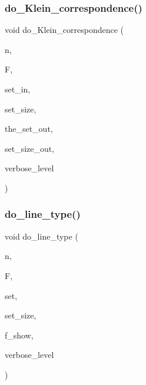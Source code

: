 \subsubsection{\texorpdfstring{do\+\_\+\+Klein\+\_\+correspondence()}{do\_Klein\_correspondence()}}
{\footnotesize\ttfamily void do\+\_\+\+Klein\+\_\+correspondence (\begin{DoxyParamCaption}\item[{\mbox{\hyperlink{galois_8h_a09fddde158a3a20bd2dcadb609de11dc}{I\+NT}}}]{n,  }\item[{\mbox{\hyperlink{classfinite__field}{finite\+\_\+field}} $\ast$}]{F,  }\item[{\mbox{\hyperlink{galois_8h_a09fddde158a3a20bd2dcadb609de11dc}{I\+NT}} $\ast$}]{set\+\_\+in,  }\item[{\mbox{\hyperlink{galois_8h_a09fddde158a3a20bd2dcadb609de11dc}{I\+NT}}}]{set\+\_\+size,  }\item[{\mbox{\hyperlink{galois_8h_a09fddde158a3a20bd2dcadb609de11dc}{I\+NT}} $\ast$\&}]{the\+\_\+set\+\_\+out,  }\item[{\mbox{\hyperlink{galois_8h_a09fddde158a3a20bd2dcadb609de11dc}{I\+NT}} \&}]{set\+\_\+size\+\_\+out,  }\item[{\mbox{\hyperlink{galois_8h_a09fddde158a3a20bd2dcadb609de11dc}{I\+NT}}}]{verbose\+\_\+level }\end{DoxyParamCaption})}

\mbox{\label{geometric__operations_8_c_a56d3becea533e33d94f5f83cf2f77d56}} 
\subsubsection{\texorpdfstring{do\+\_\+line\+\_\+type()}{do\_line\_type()}}
{\footnotesize\ttfamily void do\+\_\+line\+\_\+type (\begin{DoxyParamCaption}\item[{\mbox{\hyperlink{galois_8h_a09fddde158a3a20bd2dcadb609de11dc}{I\+NT}}}]{n,  }\item[{\mbox{\hyperlink{classfinite__field}{finite\+\_\+field}} $\ast$}]{F,  }\item[{\mbox{\hyperlink{galois_8h_a09fddde158a3a20bd2dcadb609de11dc}{I\+NT}} $\ast$}]{set,  }\item[{\mbox{\hyperlink{galois_8h_a09fddde158a3a20bd2dcadb609de11dc}{I\+NT}}}]{set\+\_\+size,  }\item[{\mbox{\hyperlink{galois_8h_a09fddde158a3a20bd2dcadb609de11dc}{I\+NT}}}]{f\+\_\+show,  }\item[{\mbox{\hyperlink{galois_8h_a09fddde158a3a20bd2dcadb609de11dc}{I\+NT}}}]{verbose\+\_\+level }\end{DoxyParamCaption})}

